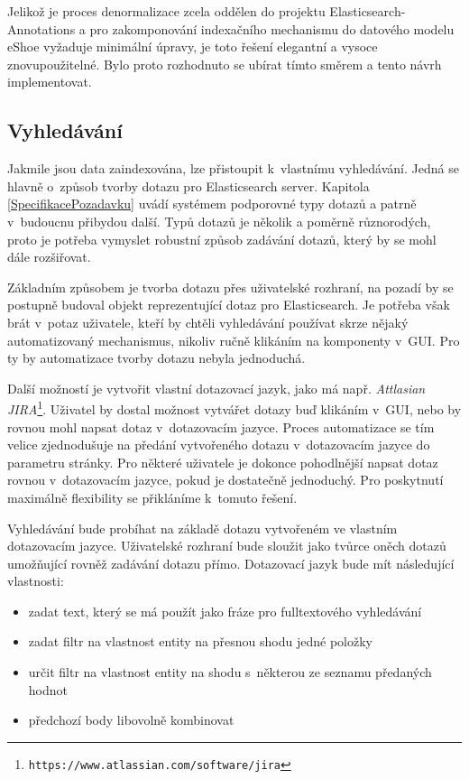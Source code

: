 \documentclass[11pt,oneside]{fithesis2}
\begin{document}
Jelikož je proces denormalizace zcela oddělen do projektu Elasticsearch-Annotations a pro zakomponování indexačního mechanismu do datového modelu eShoe vyžaduje minimální úpravy, je toto řešení elegantní a vysoce znovupoužitelné. Bylo proto rozhodnuto se ubírat tímto směrem a tento návrh implementovat.

\subsection{Vyhledávání}
Jakmile jsou data zaindexována, lze přistoupit k~vlastnímu vyhledávání. Jedná se hlavně o~způsob tvorby dotazu pro Elasticsearch server. Kapitola \ref{SpecifikacePozadavku} uvádí systémem podporovné typy dotazů a patrně v~budoucnu přibydou další. Typů dotazů je několik a poměrně různorodých, proto je potřeba vymyslet robustní způsob zadávání dotazů, který by se mohl dále rozšiřovat.

Základním způsobem je tvorba dotazu přes uživatelské rozhraní, na pozadí by se postupně budoval objekt reprezentující dotaz pro Elasticsearch. Je potřeba však brát v~potaz uživatele, kteří by chtěli vyhledávání používat skrze nějaký automatizovaný mechanismus, nikoliv ručně klikáním na komponenty v~GUI. Pro ty by automatizace tvorby dotazu nebyla jednoduchá.

Další možností je vytvořit vlastní dotazovací jazyk, jako má např. \emph{Attlasian JIRA}\footnote{\texttt{https://www.atlassian.com/software/jira}}. Uživatel by dostal možnost vytvářet dotazy buď klikáním v~GUI, nebo by rovnou mohl napsat dotaz v~dotazovacím jazyce. Proces automatizace se tím velice zjednodušuje na předání vytvořeného dotazu v~dotazovacím jazyce do parametru stránky. Pro některé uživatele je dokonce pohodlnější napsat dotaz rovnou v~dotazovacím jazyce, pokud je dostatečně jednoduchý. Pro poskytnutí maximálně flexibility se přikláníme k~tomuto řešení.

Vyhledávání bude probíhat na základě dotazu vytvořeném ve vlastním dotazovacím jazyce. Uživatelské rozhraní bude sloužit jako tvůrce oněch dotazů umožňující rovněž zadávání dotazu přímo. Dotazovací jazyk bude mít následující vlastnosti:
\begin{itemize}
	\item zadat text, který se má použít jako fráze pro fulltextového vyhledávání
	\item zadat filtr na vlastnost entity na přesnou shodu jedné položky
	\item určit filtr na vlastnost entity na shodu s~některou ze seznamu předaných hodnot
	\item předchozí body libovolně kombinovat
\end{itemize}
\end{document}
